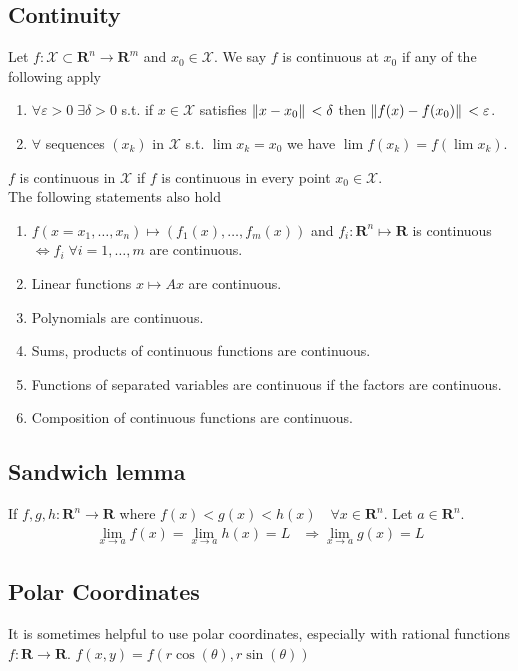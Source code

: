 \documentclass[8pt]{extarticle}
\newcommand{\R}{{\mathbb R}}
\newcommand{\X}{{\mathcal X}}
\newcommand{\ra}{{\rightarrow}}
\def\R{\mathbf{R}}
\begin{document}
\begin{multicols*}{3}
  \subsection{Continuity}
  Let $f: \X \subset \R^n \ra \R^m$
  and $x_0 \in \X$. We say $f$ is continuous
  at $x_0$ if any of the following apply
  \begin{enumerate}[label=(\arabic*)]
    \item $\forall \varepsilon > 0 \; \exists \delta > 0$
          s.t. if $x \in \X$ satisfies $\norm*{x - x_0} < \delta$
          then $\norm*{f(x) - f(x_0)} < \varepsilon$.
    \item $\forall$ sequences $(x_k)$ in $\X$
          s.t. $\lim x_k = x_0$ we have $\lim f(x_k) = f (\lim x_k)$.
  \end{enumerate}
  $f$ is
  continuous in $\X$ if $f$ is continuous
  in every point $x_0 \in \X$.\\
  The following statements also hold
  \begin{enumerate}[label=(\arabic*)]
    \item $f(x = x_1, \dots, x_n) \mapsto (f_1(x), \dots, f_m(x))$
          and $f_i: \R^n \mapsto \R$ is continuous
          $\Leftrightarrow f_i \; \forall i = 1, \dots, m$
          are continuous.
    \item Linear functions $x \mapsto Ax$ are continuous.
    \item Polynomials are continuous.
    \item Sums, products of continuous functions are continuous.
    \item Functions of separated variables are continuous if the factors are continuous.
    \item Composition of continuous functions are continuous.
  \end{enumerate}
  \subsection{Sandwich lemma}
  If $f, g, h: \R^n \ra \R$ where
  $f(x) < g(x) < h(x) \quad \forall x \in \R^n$. Let
  $a \in \R^n$.
  \begin{align*}
    \lim_{x \ra a} f(x) = \lim_{x \ra a} h(x) = L
     & \Rightarrow \lim_{x \ra a} g(x) = L
  \end{align*}
  \subsection{Polar Coordinates}
  It is sometimes helpful to use polar coordinates, especially
  with rational functions $f: \R \ra \R$.
  $f(x, y) = f(r \cos(\theta), r \sin(\theta))$

\end{multicols*}
\end{document}
